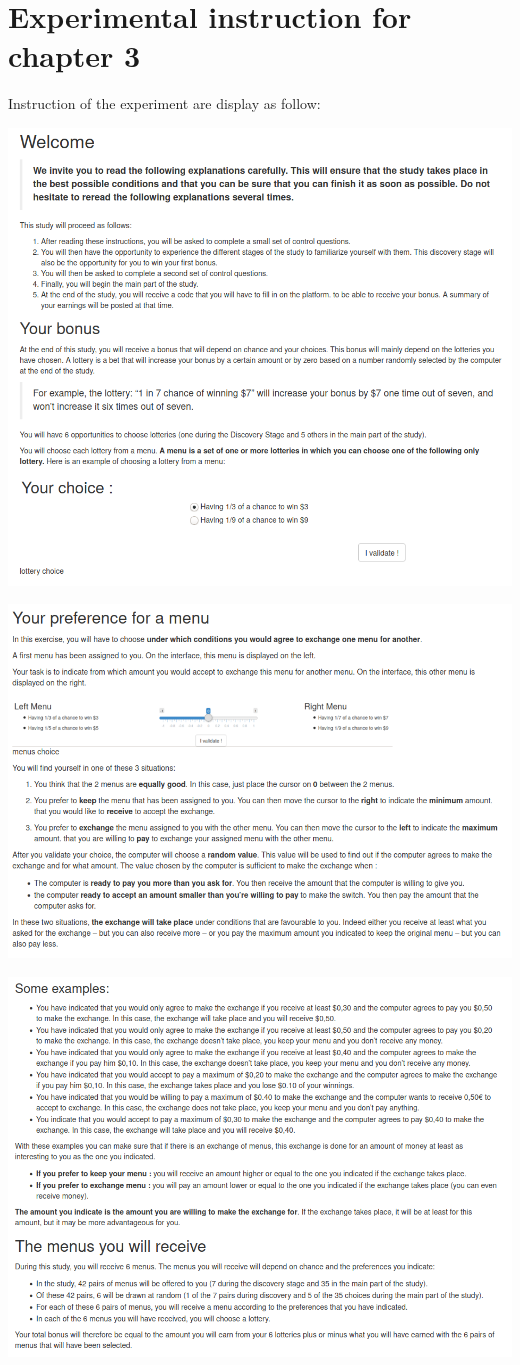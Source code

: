 \documentclass[
]{book}
\begin{document}
\hypertarget{expe-instruc3}{%
\chapter{Experimental instruction for chapter 3}\label{expe-instruc3}}

Instruction of the experiment are display as follow:

\includegraphics[width=0.9\linewidth]{annexe_file/consigne_c3_1}

\includegraphics[width=0.9\linewidth]{annexe_file/consigne_c3_2}

\includegraphics[width=0.9\linewidth]{annexe_file/consigne_c3_3}
\end{document}

